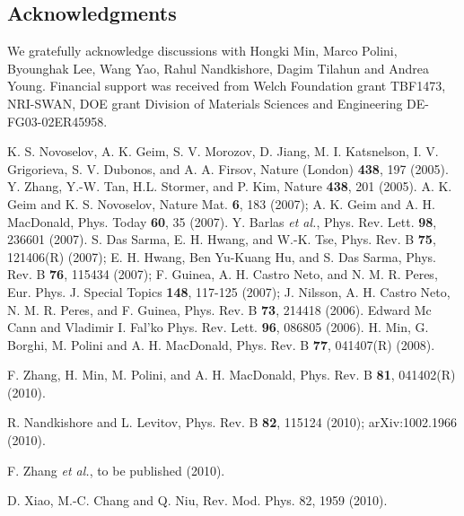 \documentclass[twocolumn,prb,showpacs,preprintnumbers,amsmath,amssymb]{revtex4}
\begin{document}
\subsection*{Acknowledgments}
We gratefully acknowledge discussions with Hongki Min, Marco Polini, Byounghak Lee, Wang Yao,
Rahul Nandkishore, Dagim Tilahun and Andrea Young.
Financial support was received from Welch Foundation grant TBF1473, 
NRI-SWAN, DOE grant Division of Materials Sciences and Engineering DE-FG03-02ER45958.

 


\begin{thebibliography}{99}
%
K. S. Novoselov, A. K. Geim, S. V. Morozov, D. Jiang, M. I. Katsnelson, I. V. Grigorieva, S. V. Dubonos, and A. A. Firsov,
Nature (London) {\bf 438}, 197 (2005).
%
	Y. Zhang, Y.-W. Tan, H.L. Stormer, and P. Kim, Nature {\bf 438}, 201 (2005).
%
        A. K. Geim and K. S. Novoselov, Nature Mat. {\bf 6}, 183 (2007);      
        A. K. Geim and A. H. MacDonald, Phys. Today {\bf 60}, 35 (2007).
%
 Y. Barlas {\em et al.}, Phys. Rev. Lett. {\bf 98}, 236601 (2007).
%
S. Das Sarma, E. H. Hwang, and W.-K. Tse, Phys. Rev. B {\bf 75}, 121406(R) (2007);
E. H. Hwang, Ben Yu-Kuang Hu, and S. Das Sarma, Phys. Rev. B {\bf 76}, 115434 (2007);
F. Guinea, A. H. Castro Neto, and N. M. R. Peres, Eur. Phys. J. Special Topics {\bf 148}, 117-125 (2007);
J. Nilsson, A. H. Castro Neto, N. M. R. Peres, and F. Guinea, Phys. Rev. B {\bf 73}, 214418 (2006).
%
Edward Mc Cann and Vladimir I. Fal'ko
Phys. Rev. Lett. {\bf 96}, 086805 (2006).
%
                H. Min, G. Borghi, M. Polini and A. H. MacDonald, 
                Phys. Rev. B {\bf 77}, 041407(R) (2008).
                
F. Zhang, H. Min, M. Polini, and A. H. MacDonald,
Phys. Rev. B {\bf 81}, 041402(R) (2010).

%

R. Nandkishore and L. Levitov, Phys. Rev. B {\bf 82}, 115124 (2010);
arXiv:1002.1966 (2010).

F. Zhang {\em et al.}, to be published (2010).

D. Xiao, M.-C. Chang and Q. Niu,
 Rev. Mod. Phys. 82, 1959 (2010). 


\end{thebibliography}
\end{document}
